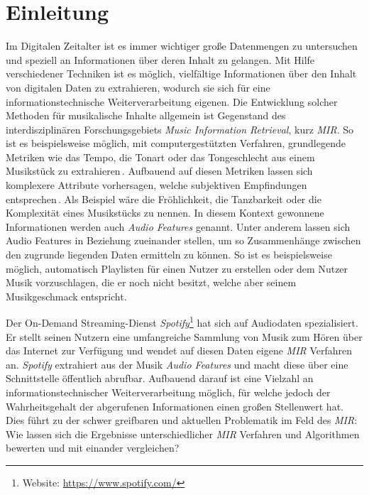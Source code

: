 \section*{Einleitung}
\label{sec:Einleitung}

Im Digitalen Zeitalter ist es immer wichtiger große Datenmengen zu untersuchen und speziell an Informationen über deren Inhalt zu gelangen.
Mit Hilfe verschiedener Techniken ist es möglich, vielfältige Informationen über den Inhalt von digitalen Daten zu extrahieren, wodurch sie sich für eine informationstechnische Weiterverarbeitung eigenen.
Die Entwicklung solcher Methoden für musikalische Inhalte allgemein ist Gegenstand des interdisziplinären Forschungsgebiets \textit{Music Information Retrieval}, kurz \textit{MIR}.
So ist es beispielsweise möglich, mit computergestützten Verfahren, grundlegende Metriken wie das Tempo, die Tonart oder das Tongeschlecht aus einem Musikstück zu extrahieren\,\cite{Casey2008}.
Aufbauend auf diesen Metriken lassen sich komplexere Attribute vorhersagen, welche subjektiven Empfindungen entsprechen\,\cite{Sturm2013}.
Als Beispiel wäre die Fröhlichkeit, die Tanzbarkeit oder die Komplexität eines Musikstücks zu nennen.
In diesem Kontext gewonnene Informationen werden auch \textit{Audio Features} genannt.
Unter anderem lassen sich Audio Features in Beziehung zueinander stellen, um so Zusammenhänge zwischen den zugrunde liegenden Daten ermitteln zu können.
So ist es beispielsweise möglich, automatisch Playlisten für einen Nutzer zu erstellen oder dem Nutzer Musik vorzuschlagen, die er noch nicht besitzt, welche aber seinem Musikgeschmack entspricht.

Der On-Demand Streaming-Dienst \textit{Spotify}\footnote{Website: \url{https://www.spotify.com/}} hat sich auf Audiodaten spezialisiert.
Er stellt seinen Nutzern eine umfangreiche Sammlung von Musik zum Hören über das Internet zur Verfügung und wendet auf diesen Daten eigene \textit{MIR} Verfahren an.
\textit{Spotify} extrahiert aus der Musik \textit{Audio Features} und macht diese über eine Schnittstelle öffentlich abrufbar.
Aufbauend darauf ist eine Vielzahl an informationstechnischer Weiterverarbeitung möglich, für welche jedoch der Wahrheitsgehalt der abgerufenen Informationen einen großen Stellenwert hat.
Dies führt zu der schwer greifbaren und aktuellen Problematik im Feld des \textit{MIR}:
Wie lassen sich die Ergebnisse unterschiedlicher \textit{MIR} Verfahren und Algorithmen bewerten und mit einander vergleichen? \cite{Downie2004}

